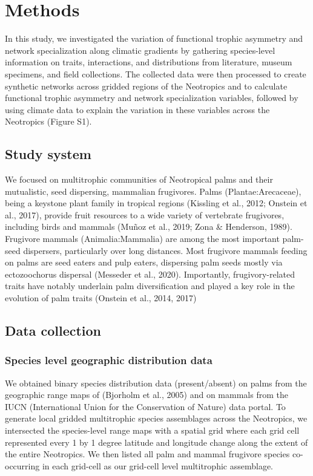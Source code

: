 \documentclass[
]{agujournal2019}
\begin{document}
\section{Methods}\label{methods}

In this study, we investigated the variation of functional trophic
asymmetry and network specialization along climatic gradients by
gathering species-level information on traits, interactions, and
distributions from literature, museum specimens, and field collections.
The collected data were then processed to create synthetic networks
across gridded regions of the Neotropics and to calculate functional
trophic asymmetry and network specialization variables, followed by
using climate data to explain the variation in these variables across
the Neotropics (Figure S1).

\subsection{Study system}\label{study-system}

We focused on multitrophic communities of Neotropical palms and their
mutualistic, seed dispersing, mammalian frugivores. Palms
(Plantae:Arecaceae), being a keystone plant family in tropical regions
(Kissling et al., 2012; Onstein et al., 2017), provide fruit resources
to a wide variety of vertebrate frugivores, including birds and mammals
(Muñoz et al., 2019; Zona \& Henderson, 1989). Frugivore mammals
(Animalia:Mammalia) are among the most important palm-seed dispersers,
particularly over long distances. Most frugivore mammals feeding on
palms are seed eaters and pulp eaters, dispersing palm seeds mostly via
ectozoochorus dispersal (Messeder et al., 2020). Importantly,
frugivory-related traits have notably underlain palm diversification and
played a key role in the evolution of palm traits (Onstein et al., 2014,
2017)

\subsection{Data collection}\label{data-collection}

\subsubsection{Species level geographic distribution
data}\label{species-level-geographic-distribution-data}

We obtained binary species distribution data (present/absent) on palms
from the geographic range maps of (Bjorholm et al., 2005) and on mammals
from the IUCN (International Union for the Conservation of Nature) data
portal. To generate local gridded multitrophic species assemblages
across the Neotropics, we intersected the species-level range maps with
a spatial grid where each grid cell represented every 1 by 1 degree
latitude and longitude change along the extent of the entire Neotropics.
We then listed all palm and mammal frugivore species co-occurring in
each grid-cell as our grid-cell level multitrophic assemblage.
\end{document}
